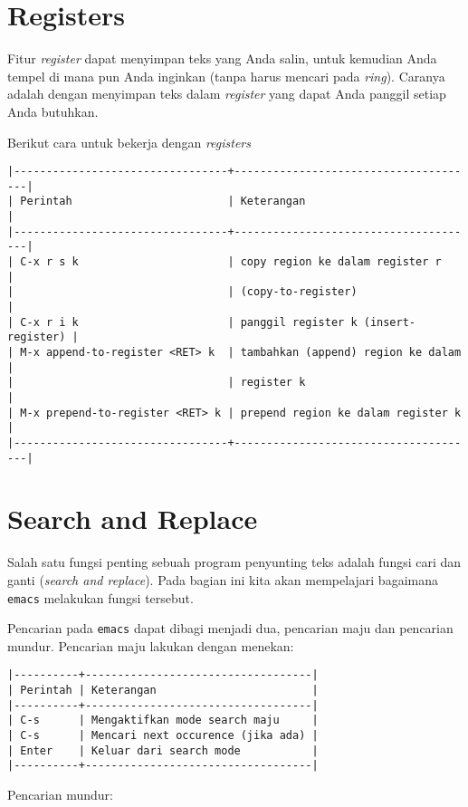 \documentclass{article}
\begin{document}
\section{Registers}
Fitur \emph{register} dapat menyimpan teks yang Anda salin, untuk kemudian 
Anda tempel di mana pun Anda inginkan (tanpa harus mencari pada \emph{ring}).
Caranya adalah dengan menyimpan teks dalam \emph{register} yang dapat Anda
panggil setiap Anda butuhkan. 

Berikut cara untuk bekerja dengan \emph{registers}

\begin{verbatim}
|---------------------------------+--------------------------------------|
| Perintah                        | Keterangan                           |
|---------------------------------+--------------------------------------|
| C-x r s k                       | copy region ke dalam register r      |
|                                 | (copy-to-register)                   |
| C-x r i k                       | panggil register k (insert-register) |
| M-x append-to-register <RET> k  | tambahkan (append) region ke dalam   |
|                                 | register k                           |
| M-x prepend-to-register <RET> k | prepend region ke dalam register k   |
|---------------------------------+--------------------------------------|
\end{verbatim}

\section{Search and Replace}
Salah satu fungsi penting sebuah program penyunting teks adalah fungsi cari
dan ganti (\emph{search and replace}). Pada bagian ini kita akan mempelajari
bagaimana \verb=emacs= melakukan fungsi tersebut.

Pencarian pada \verb=emacs= dapat dibagi menjadi dua, pencarian maju dan 
pencarian mundur. Pencarian maju lakukan dengan menekan:

\begin{verbatim}
|----------+-----------------------------------|
| Perintah | Keterangan                        |
|----------+-----------------------------------|
| C-s      | Mengaktifkan mode search maju     |
| C-s      | Mencari next occurence (jika ada) |
| Enter    | Keluar dari search mode           |
|----------+-----------------------------------|
\end{verbatim}

Pencarian mundur:
\end{document}
